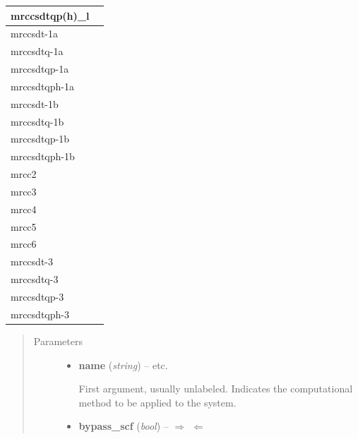 \documentclass[letterpaper,10pt,english]{sphinxmanual}
\begin{document}
\begin{fulllineitems}
\begin{longtable}{|l|l|}
mrccsdtqp(h)\_l
 & \\\hline

mrccsdt-1a
 & \\\hline

mrccsdtq-1a
 & \\\hline

mrccsdtqp-1a
 & \\\hline

mrccsdtqph-1a
 & \\\hline

mrccsdt-1b
 & \\\hline

mrccsdtq-1b
 & \\\hline

mrccsdtqp-1b
 & \\\hline

mrccsdtqph-1b
 & \\\hline

mrcc2
 & \\\hline

mrcc3
 & \\\hline

mrcc4
 & \\\hline

mrcc5
 & \\\hline

mrcc6
 & \\\hline

mrccsdt-3
 & \\\hline

mrccsdtq-3
 & \\\hline

mrccsdtqp-3
 & \\\hline

mrccsdtqph-3
 & \\\hline
\end{longtable}

\begin{quote}\begin{description}
\item[{Parameters}] \leavevmode\begin{itemize}
\item {} 
\textbf{name} (\emph{string}) -- 
 \textbar{}\textbar{}  \textbar{}\textbar{}  \textbar{}\textbar{} etc.

First argument, usually unlabeled. Indicates the computational method
to be applied to the system.


\item {} 
\textbf{bypass\_scf} (\emph{bool}) -- 
 \textbar{}\textbar{} $\Rightarrow$  $\Leftarrow$


\end{itemize}
\end{description}
\end{quote}
\end{fulllineitems}
\end{document}

